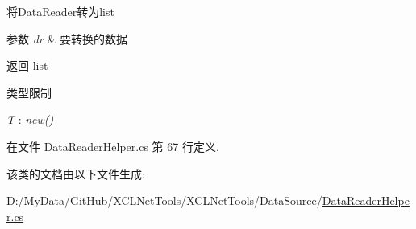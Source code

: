 将\+Data\+Reader转为list 


\begin{DoxyParams}{参数}
{\em dr} & 要转换的数据\\
\hline
\end{DoxyParams}
\begin{DoxyReturn}{返回}
list
\end{DoxyReturn}
\begin{Desc}
\item[类型限制]\begin{description}
\item[{\em T} : {\em new()}]\end{description}
\end{Desc}


在文件 Data\+Reader\+Helper.\+cs 第 67 行定义.



该类的文档由以下文件生成\+:\begin{DoxyCompactItemize}
\item 
D\+:/\+My\+Data/\+Git\+Hub/\+X\+C\+L\+Net\+Tools/\+X\+C\+L\+Net\+Tools/\+Data\+Source/\hyperlink{_data_reader_helper_8cs}{Data\+Reader\+Helper.\+cs}\end{DoxyCompactItemize}
